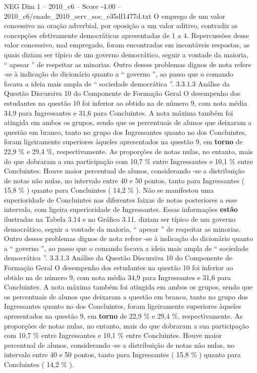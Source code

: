 \begin{textsample}{NEG Dim 1 – 2010\_c6 – Score -4.00 – 2010\_c6/enade\_2010\_serv\_soc\_e35df1477d.txt}
O emprego de um valor concessivo na oração adverbial, por oposição a um valor aditivo, contradiz as concepções efetivamente democráticas apresentadas de 1 a 4.
Repercussões desse valor concessivo, mal empregado, foram encontradas em incontáveis respostas, as quais diziam ser típico de um governo democrático, seguir a vontade da maioria, “ apesar ” de respeitar as minorias.
Outro desses problemas dignos de nota refere -se à indicação do dicionário quanto a “ governo ”, ao passo que o comando focava a ideia mais ampla de “ sociedade democrática ”. 3.3.1.3 Análise da Questão Discursiva 10 do Componente de Formação Geral O desempenho dos estudantes na questão 10 foi inferior ao obtido na de número 9, com nota média 34,9 para Ingressantes e 31,6 para Concluintes.
A nota máxima também foi atingida em ambos os grupos, sendo que os percentuais de alunos que deixaram a questão em branco, tanto no grupo dos Ingressantes quanto no dos Concluintes, foram ligeiramente superiores àqueles apresentados na questão 9, em \textbf{torno} de 22,9 \% e 29,4 \%, respectivamente.
As proporções de notas nulas, no entanto, mais do que dobraram a sua participação com 10,7 \% entre Ingressantes e 10,1 \% entre Concluintes.
Houve maior percentual de alunos, considerando -se a distribuição de notas não nulas, no intervalo entre 40 e 50 pontos, tanto para Ingressantes ( 15,8 \% ) quanto para Concluintes ( 14,2 \% ).
Não se manifestou uma superioridade de Concluintes nas diferentes faixas de notas posteriores a esse intervalo, com ligeira superioridade de Ingressantes.
Essas informações \textbf{estão} ilustradas na Tabela 3.14 e no Gráfico 3.11. diziam ser típico de um governo democrático, seguir a vontade da maioria, “ apesar ” de respeitar as minorias.
Outro desses problemas dignos de nota refere -se à indicação do dicionário quanto a “ governo ”, ao passo que o comando focava a ideia mais ampla de “ sociedade democrática ”. 3.3.1.3 Análise da Questão Discursiva 10 do Componente de Formação Geral O desempenho dos estudantes na questão 10 foi inferior ao obtido na de número 9, com nota média 34,9 para Ingressantes e 31,6 para Concluintes.
A nota máxima também foi atingida em ambos os grupos, sendo que os percentuais de alunos que deixaram a questão em branco, tanto no grupo dos Ingressantes quanto no dos Concluintes, foram ligeiramente superiores àqueles apresentados na questão 9, em \textbf{torno} de 22,9 \% e 29,4 \%, respectivamente.
As proporções de notas nulas, no entanto, mais do que dobraram a sua participação com 10,7 \% entre Ingressantes e 10,1 \% entre Concluintes.
Houve maior percentual de alunos, considerando -se a distribuição de notas não nulas, no intervalo entre 40 e 50 pontos, tanto para Ingressantes ( 15,8 \% ) quanto para Concluintes ( 14,2 \% ).

\end{textsample}
